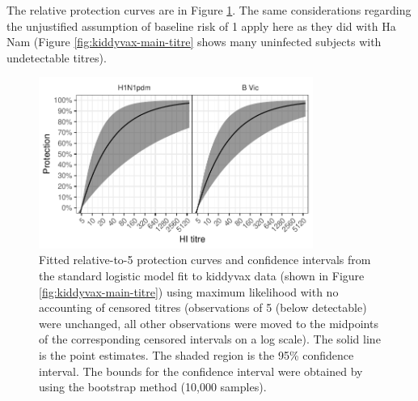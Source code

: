 The relative protection curves are in Figure \ref{fig:kiddyvaxmain-prot-rel-lr-boot}. The same considerations regarding the unjustified assumption of baseline risk of 1 apply here as they did with Ha Nam (Figure \ref{fig:kiddyvax-main-titre} shows many uninfected subjects with undetectable titres).

\begin{figure}[htp]
	\centering
	\includegraphics[width=0.8\textwidth]{../fit-logistic-boot-plot/kiddyvaxmain-prot-rel.pdf}
	\caption{
	Fitted relative-to-5 protection curves and confidence intervals from the standard logistic model fit to kiddyvax data (shown in Figure \ref{fig:kiddyvax-main-titre}) using maximum likelihood with no accounting of censored titres (observations of 5 (below detectable) were unchanged, all other observations were moved to the midpoints of the corresponding censored intervals on a log scale). The solid line is the point estimates. The shaded region is the 95\% confidence interval. The bounds for the confidence interval were obtained by using the bootstrap method (10,000 samples).
	}
	\label{fig:kiddyvaxmain-prot-rel-lr-boot}
\end{figure}
